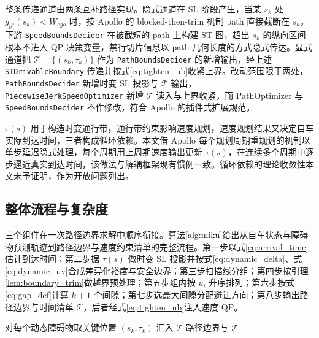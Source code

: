 \documentclass[a4paper,11pt]{ctexart}
\theoremstyle{definition}
\begin{document}
整条传递通道由两条互补路径实现。隐式通道在 SL 阶段产生，当某 $s_k$ 处 $g_{p^{*}}(s_k)<W_{ego}$ 时，按 Apollo 的 blocked-then-trim 机制 path 直接截断在 $s_k$，下游 \texttt{SpeedBoundsDecider} 在被截短的 path 上构建 ST 图，超出 $s_k$ 的纵向区间根本不进入 QP 决策变量，禁行切片信息以 path 几何长度的方式隐式传达。显式通道把 $\mathcal{T}=\{(s_k, \tau_k)\}$ 作为 \texttt{PathBoundsDecider} 的新增输出，经上述 \texttt{STDrivableBoundary} 传递并按式\eqref{eq:tighten_ub}收紧上界。改动范围限于两处，\texttt{PathBoundsDecider} 新增时变 SL 投影与 $\mathcal{T}$ 输出，\texttt{PiecewiseJerkSpeedOptimizer} 新增 $\mathcal{T}$ 读入与上界收紧，而 PathOptimizer 与 \texttt{SpeedBoundsDecider} 不作修改，符合 Apollo 的插件式扩展规范。

$\tau(s)$ 用于构造时变通行带，通行带约束影响速度规划，速度规划结果又决定自车实际到达时间，三者构成循环依赖。本文借 Apollo 每个规划周期重规划的机制以单步延迟隐式处理，每个周期用上周期速度输出更新 $\tau(s)$，在连续多个周期中逐步逼近真实到达时间，该做法与解耦框架现有惯例一致。循环依赖的理论收敛性本文未予证明，作为开放问题列出。

\subsection{整体流程与复杂度}
\label{sec:method_algorithm}

三个组件在一次路径边界求解中顺序衔接。算法\ref{alg:miku}给出从自车状态与障碍物预测轨迹到路径边界与速度约束清单的完整流程。第一步以式\eqref{eq:arrival_time}估计到达时间；第二步据 $\tau(s)$ 做时变 SL 投影并按式\eqref{eq:dynamic_delta}、式\eqref{eq:dynamic_uv}合成差异化裕度与安全边界；第三步扫描线分组；第四步按引理\ref{lem:boundary_trim}做越界预处理；第五步组内按 $u_i$ 升序排列；第六步按式\eqref{eq:gap_def}计算 $k+1$ 个间隙；第七步选最大间隙分配避让方向；第八步输出路径边界与时间清单 $\mathcal{T}$，后者经式\eqref{eq:tighten_ub}注入速度 QP。

\begin{algorithm}[htbp]
\caption{MIKU 多障碍物统一规划求解}
\label{alg:miku}
对每个动态障碍物取关键位置 $(s_k, \tau_k)$ 汇入 $\mathcal{T}$\;
\KwRet 路径边界与 $\mathcal{T}$
\end{algorithm}
\end{document}
